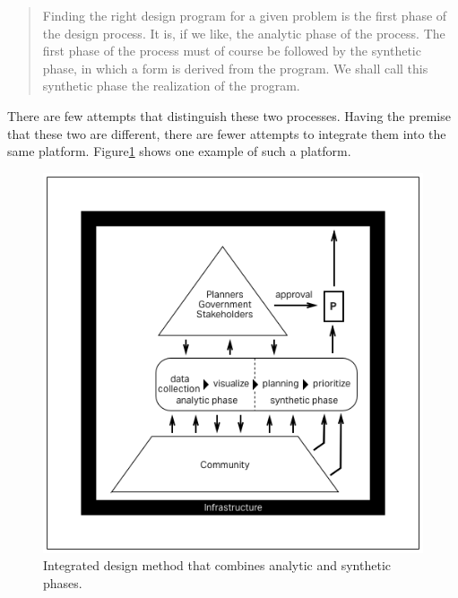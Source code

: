 \begin{quotation}
Finding the right design program for a given problem is the first phase of the design process. It is, if we like, the analytic phase of the process. The first phase of the process must of course be followed by the synthetic phase, in which a form is derived from the program. We shall call this synthetic phase the realization of the program. \cite{alexander1964notes}
\end{quotation}

There are few attempts that distinguish these two processes. Having the premise that these two are different, there are fewer attempts to integrate them into the same platform. Figure\ref{fig:collective_design} shows one example of such a platform.

\begin{figure}[htb]
  \includegraphics[width=\textwidth]{chapters/2/fig/bikebump.png}               
  \caption[diagram: integrated collective design]{Integrated design method that combines analytic and synthetic phases.}
\label{fig:collective_design}
\end{figure}


